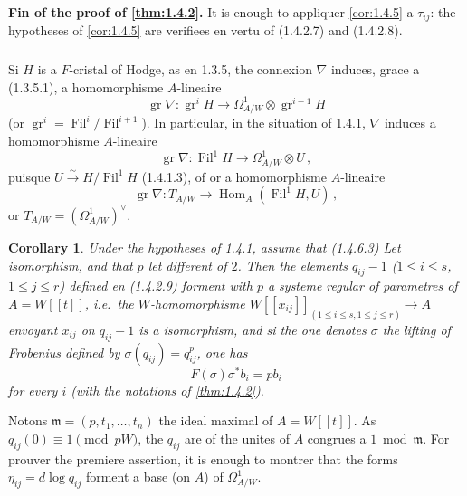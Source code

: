 \documentclass[12pt,a4paper]{article}
\theoremstyle{plain}
\newtheorem{corollary}[theorem]{Corollary}
\theoremstyle{definition}
\theoremstyle{remark}
\DeclareMathOperator{\Hom}{Hom}
\DeclareMathOperator{\gr}{gr}
\DeclareMathOperator{\Fil}{Fil}
\begin{document}
\textbf{Fin of the proof of \ref{thm:1.4.2}.} It is enough to appliquer \ref{cor:1.4.5} a $\tau_{ij}$: the hypotheses of \ref{cor:1.4.5} are verifiees en vertu of (1.4.2.7) and (1.4.2.8).

\subsubsection{}

Si $H$ is a $F$-cristal of Hodge, as en 1.3.5, the connexion $\nabla$ induces, grace a (1.3.5.1), a homomorphisme $A$-lineaire
\begin{equation}\label{eq:1.4.6.1}
\gr\nabla : \gr^iH \longrightarrow \Omega^1_{A/W} \otimes \gr^{i-1}H\end{equation}
(or $\gr^i = \Fil^i/\Fil^{i+1}$). In particular, in the situation of 1.4.1, $\nabla$ induces a homomorphisme $A$-lineaire
\begin{equation}\label{eq:1.4.6.2}
\gr\nabla : \Fil^1H \longrightarrow \Omega^1_{A/W} \otimes U\,,
\end{equation}
puisque $U \xrightarrow{\sim} H/\Fil^1H$ (1.4.1.3), of or a homomorphisme $A$-lineaire
\begin{equation}\label{eq:1.4.6.3}
\gr\nabla : T_{A/W} \longrightarrow \Hom_A(\Fil^1H, U)\,,
\end{equation}
or $T_{A/W} = (\Omega^1_{A/W})^\vee$.

\begin{corollary}\label{cor:1.4.7}
Under the hypotheses of \emph{1.4.1}, assume that (1.4.6.3) Let isomorphism, and that $p$ let different of $2$. Then the elements $q_{ij} - 1$ ($1 \leq i \leq s$, $1 \leq j \leq r$) defined en (1.4.2.9) forment with $p$ a systeme regular of parametres of $A = W[[t]]$, i.e.\ the $W$-homomorphisme $W[[x_{ij}]]_{(1 \leq i \leq s, 1 \leq j \leq r)} \to A$ envoyant $x_{ij}$ on $q_{ij} - 1$ is a isomorphism, and si the one denotes $\sigma$ the lifting of Frobenius defined by $\sigma(q_{ij}) = q_{ij}^p$, one has
\begin{equation}\label{eq:1.4.7.1}
F(\sigma)\sigma^*b_i = pb_i\end{equation}
for every $i$ (with the notations of \ref{thm:1.4.2}).
\end{corollary}

Notons $\mathfrak{m} = (p, t_1, \ldots, t_n)$ the ideal maximal of $A = W[[t]]$. As $q_{ij}(0) \equiv 1 \pmod{pW}$, the $q_{ij}$ are of the unites of $A$ congrues a $1 \bmod \mathfrak{m}$. For prouver the premiere assertion, it is enough to montrer that the forms $\eta_{ij} = d\log q_{ij}$ forment a base (on $A$) of $\Omega^1_{A/W}$.
\end{document}
